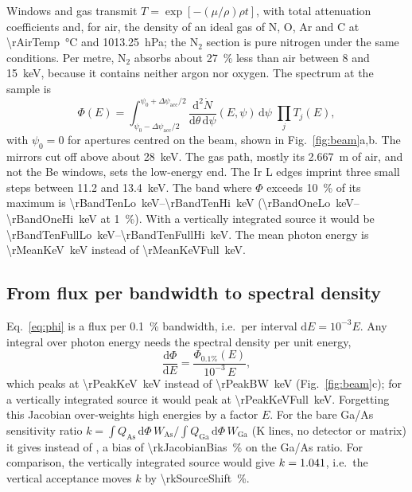 \documentclass[11pt,a4paper]{article}
\newcommand{\dd}{\mathrm{d}}
\begin{document}
Windows and gas transmit $T=\exp[-(\mu/\rho)\rho t]$, with total attenuation coefficients and,
for air, the density of an ideal gas of N, O, Ar and C at \qty{\rAirTemp}{\degreeCelsius} and
\qty{1013.25}{hPa}; the N$_2$ section is pure nitrogen under the same conditions. Per metre, N$_2$
absorbs about \qty{27}{\percent} less than air between \num{8} and \qty{15}{keV}, because it contains
neither argon nor oxygen. The spectrum at the sample is
\begin{equation}
\Phi(E) = \int_{\psi_0-\Delta\psi_\mathrm{acc}/2}^{\psi_0+\Delta\psi_\mathrm{acc}/2}
\frac{\dd^2\dot N}{\dd\theta\,\dd\psi}(E,\psi)\,\dd\psi\;\prod_{j} T_j(E),
\label{eq:phi}
\end{equation}
with $\psi_0=0$ for apertures centred on the beam, shown in Fig.~\ref{fig:beam}a,b. The mirrors cut
off above about \qty{28}{keV}. The gas path, mostly its \qty{2.667}{m} of air, and not the Be windows,
sets the low-energy end.
The Ir L edges imprint three small steps between \num{11.2} and \qty{13.4}{keV}. The band where $\Phi$
exceeds \qty{10}{\percent} of its maximum is \qtyrange{\rBandTenLo}{\rBandTenHi}{keV}
(\qtyrange{\rBandOneLo}{\rBandOneHi}{keV} at \qty{1}{\percent}). With a vertically integrated source it
would be \qtyrange{\rBandTenFullLo}{\rBandTenFullHi}{keV}. The mean photon energy is
\qty{\rMeanKeV}{keV} instead of \qty{\rMeanKeVFull}{keV}.

\subsection{From flux per bandwidth to spectral density}\label{sec:jacobian}
Eq.~\eqref{eq:phi} is a flux per \qty{0.1}{\percent} bandwidth, i.e.\ per interval
$\dd E = 10^{-3}E$. Any integral over photon energy needs the spectral density per unit energy,
\begin{equation}
\frac{\dd\Phi}{\dd E} = \frac{\Phi_{0.1\%}(E)}{10^{-3}\,E},
\label{eq:jacobian}
\end{equation}
which peaks at \qty{\rPeakKeV}{keV} instead of \qty{\rPeakBW}{keV} (Fig.~\ref{fig:beam}c); for a
vertically integrated source it would peak at \qty{\rPeakKeVFull}{keV}. Forgetting this Jacobian
over-weights high energies by a factor $E$. For the bare Ga/As sensitivity ratio
$k=\int Q_{\mathrm{As}}\,\dd\Phi\, W_\mathrm{As} / \int Q_{\mathrm{Ga}}\,\dd\Phi\, W_\mathrm{Ga}$ (K lines,
no detector or matrix) it gives \rkBW{} instead of \rkKeV, a bias of \qty{\rkJacobianBias}{\percent} on the
Ga/As ratio. For comparison, the vertically integrated source would give $k=1.041$, i.e.\ the
vertical acceptance moves $k$ by \qty{\rkSourceShift}{\percent}.
\end{document}
